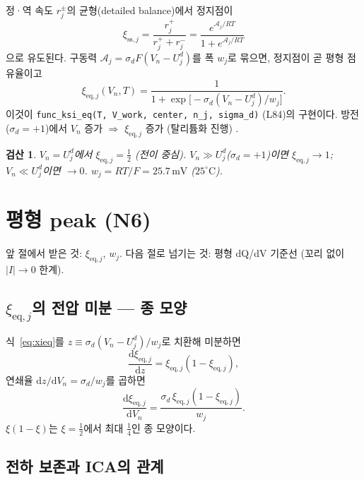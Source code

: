 \documentclass[11pt,a4paper]{article}
\newtheorem*{verifybox}{검산}
\newcommand{\dd}{\mathrm{d}}
\newcommand{\eq}{\mathrm{eq}}
\newcommand{\sstat}{\mathrm{ss}}
\begin{document}
정·역 속도 $r_j^\pm$의 균형(detailed balance)에서 정지점이
\begin{equation}
  \xi_{\sstat,j} = \frac{r_j^+}{r_j^+ + r_j^-}
  = \frac{e^{\mathcal{A}_j/RT}}{1+e^{\mathcal{A}_j/RT}}
  \label{eq:stationary}
\end{equation}
으로 유도된다. 구동력 $\mathcal{A}_j = \sigma_d F(V_n - U_j^d)$를 폭 $w_j$로 묶으면,
정지점이 곧 평형 점유율이고
\begin{equation}
  \boxed{\xi_{\eq,j}(V_n, T) = \frac{1}{1+\exp\!\big[-\sigma_d(V_n-U_j^d)/w_j\big]}.}
  \label{eq:xieq}
\end{equation}
이것이 \texttt{func\_ksi\_eq(T, V\_work, center, n\_j, sigma\_d)} (L84)의 구현이다.
방전($\sigma_d=+1$)에서 $V_n$ 증가 $\Rightarrow$ $\xi_{\eq,j}$ 증가
(탈리튬화 진행) \checkmark.

\begin{verifybox}
$V_n = U_j^d$에서 $\xi_{\eq,j} = \tfrac12$ (전이 중심).
$V_n \gg U_j^d$($\sigma_d=+1$)이면 $\xi_{\eq,j}\to1$; $V_n \ll U_j^d$이면 $\to0$.
$w_j = RT/F = 25.7\,\mathrm{mV}$ ($25^\circ\mathrm{C}$).
\end{verifybox}

\section{평형 peak (N6)}
\label{sec:eqpeak}
앞 절에서 받은 것: $\xi_{\eq,j}$, $w_j$.
다음 절로 넘기는 것: 평형 dQ/dV 기준선 (꼬리 없이 $|I|\to0$ 한계).

\subsection{$\xi_{\eq,j}$의 전압 미분 — 종 모양}

식~\eqref{eq:xieq}를 $z\equiv\sigma_d(V_n-U_j^d)/w_j$로 치환해 미분하면
\begin{equation}
  \frac{\dd\xi_{\eq,j}}{\dd z} = \xi_{\eq,j}(1-\xi_{\eq,j}),
\end{equation}
연쇄율 $\dd z/\dd V_n = \sigma_d/w_j$를 곱하면
\begin{equation}
  \frac{\dd\xi_{\eq,j}}{\dd V_n} = \frac{\sigma_d\,\xi_{\eq,j}(1-\xi_{\eq,j})}{w_j}.
  \label{eq:dxidV}
\end{equation}
$\xi(1-\xi)$는 $\xi=\tfrac12$에서 최대 $\tfrac14$인 종 모양이다.

\subsection{전하 보존과 ICA의 관계}
\end{document}
